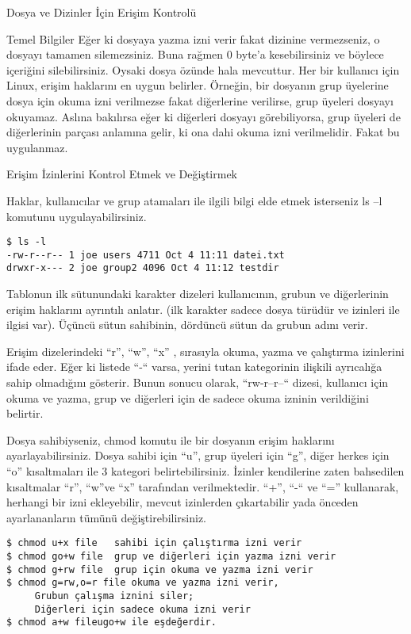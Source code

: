 \begin{section}{Dosya ve Dizinler İçin Erişim Kontrolü}
\begin{subsection}{Temel Bilgiler}
Eğer ki dosyaya yazma izni verir fakat dizinine vermezseniz, o dosyayı tamamen silemezsiniz. Buna rağmen 0 byte’a kesebilirsiniz ve böylece içeriğini silebilirsiniz. Oysaki dosya özünde hala mevcuttur. Her bir kullanıcı için Linux, erişim haklarını en uygun belirler. Örneğin, bir dosyanın grup üyelerine dosya için okuma izni verilmezse fakat diğerlerine verilirse, grup üyeleri dosyayı okuyamaz. Aslına bakılırsa eğer ki diğerleri dosyayı görebiliyorsa, grup üyeleri de diğerlerinin parçası anlamına gelir, ki ona dahi okuma izni verilmelidir. Fakat bu uygulanmaz.
\end{subsection}
\begin{subsection}{Erişim İzinlerini Kontrol Etmek ve Değiştirmek}

Haklar, kullanıcılar ve grup atamaları ile ilgili bilgi elde etmek isterseniz ls –l komutunu uygulayabilirsiniz.
\begin{verbatim}
$ ls -l
-rw-r--r-- 1 joe users 4711 Oct 4 11:11 datei.txt
drwxr-x--- 2 joe group2 4096 Oct 4 11:12 testdir
\end{verbatim}

Tablonun ilk sütunundaki karakter dizeleri kullanıcının, grubun ve diğerlerinin erişim haklarını ayrıntılı anlatır. (ilk karakter sadece dosya türüdür ve izinleri ile ilgisi var). Üçüncü sütun sahibinin, dördüncü sütun da grubun adını verir.

Erişim dizelerindeki “r”, “w”, “x” , sırasıyla okuma, yazma ve çalıştırma izinlerini ifade eder. Eğer ki listede “-“ varsa, yerini tutan kategorinin ilişkili ayrıcalığa sahip olmadığını gösterir. Bunun sonucu olarak, “rw-r--r--“ dizesi, kullanıcı için okuma ve yazma, grup ve diğerleri için de sadece okuma izninin verildiğini belirtir.

Dosya sahibiyseniz, chmod komutu ile bir dosyanın erişim haklarını ayarlayabilirsiniz. Dosya sahibi için “u”, grup üyeleri için “g”, diğer herkes için “o” kısaltmaları ile 3 kategori belirtebilirsiniz. İzinler kendilerine zaten bahsedilen kısaltmalar “r”, “w”ve “x” tarafından verilmektedir. “+”, “-“ ve “=” kullanarak, herhangi bir izni ekleyebilir, mevcut izinlerden çıkartabilir yada önceden ayarlananların tümünü değiştirebilirsiniz.
\begin{verbatim}
$ chmod u+x file   sahibi için çalıştırma izni verir
$ chmod go+w file  grup ve diğerleri için yazma izni verir
$ chmod g+rw file  grup için okuma ve yazma izni verir
$ chmod g=rw,o=r file okuma ve yazma izni verir,
     Grubun çalışma iznini siler;
     Diğerleri için sadece okuma izni verir
$ chmod a+w fileugo+w ile eşdeğerdir.
\end{verbatim}


\end{subsection}
\end{section}

